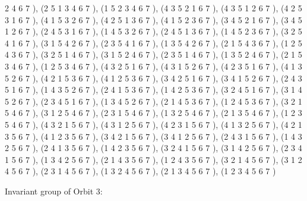 \documentclass[12pt]{article}
\begin{document}
\begin{enumerate}
2 4 6 7  ), (2 5 1 3 4 6 7  ), (1 5 2 3 4 6 7  ), (4 3 5 2 1 6 7  ), (4 3 5 1 2 6 7  ), (4 2 5 3 1 6 7  ), (4 1 5 3 2 6 7  ), (4 2 5 1 3 6 7  ), (4 1 5 2 3 6 7  ), (3 4 5 2 1 6 7  ), (3 4 5 1 2 6 7  ), (2 4 5 3 1 6 7  ), (1 4 5 3 2 6 7  ), (2 4 5 1 3 6 7  ), (1 4 5 2 3 6 7  ), (3 2 5 4 1 6 7  ), (3 1 5 4 2 6 7  ), (2 3 5 4 1 6 7  ), (1 3 5 4 2 6 7  ), (2 1 5 4 3 6 7  ), (1 2 5 4 3 6 7  ), (3 2 5 1 4 6 7  ), (3 1 5 2 4 6 7  ), (2 3 5 1 4 6 7  ), (1 3 5 2 4 6 7  ), (2 1 5 3 4 6 7  ), (1 2 5 3 4 6 7  ), (4 3 2 5 1 6 7  ), (4 3 1 5 2 6 7  ), (4 2 3 5 1 6 7  ), (4 1 3 5 2 6 7  ), (4 2 1 5 3 6 7  ), (4 1 2 5 3 6 7  ), (3 4 2 5 1 6 7  ), (3 4 1 5 2 6 7  ), (2 4 3 5 1 6 7  ), (1 4 3 5 2 6 7  ), (2 4 1 5 3 6 7  ), (1 4 2 5 3 6 7  ), (3 2 4 5 1 6 7  ), (3 1 4 5 2 6 7  ), (2 3 4 5 1 6 7  ), (1 3 4 5 2 6 7  ), (2 1 4 5 3 6 7  ), (1 2 4 5 3 6 7  ), (3 2 1 5 4 6 7  ), (3 1 2 5 4 6 7  ), (2 3 1 5 4 6 7  ), (1 3 2 5 4 6 7  ), (2 1 3 5 4 6 7  ), (1 2 3 5 4 6 7  ), (4 3 2 1 5 6 7  ), (4 3 1 2 5 6 7  ), (4 2 3 1 5 6 7  ), (4 1 3 2 5 6 7  ), (4 2 1 3 5 6 7  ), (4 1 2 3 5 6 7  ), (3 4 2 1 5 6 7  ), (3 4 1 2 5 6 7  ), (2 4 3 1 5 6 7  ), (1 4 3 2 5 6 7  ), (2 4 1 3 5 6 7  ), (1 4 2 3 5 6 7  ), (3 2 4 1 5 6 7  ), (3 1 4 2 5 6 7  ), (2 3 4 1 5 6 7  ), (1 3 4 2 5 6 7  ), (2 1 4 3 5 6 7  ), (1 2 4 3 5 6 7  ), (3 2 1 4 5 6 7  ), (3 1 2 4 5 6 7  ), (2 3 1 4 5 6 7  ), (1 3 2 4 5 6 7  ), (2 1 3 4 5 6 7  ), (1 2 3 4 5 6 7  )
\end{enumerate}
Invariant group of Orbit $3$:
\end{document}
